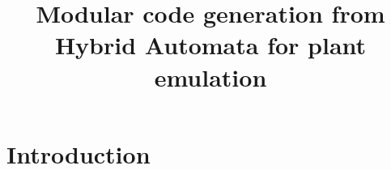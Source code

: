 \documentclass[conference]{IEEEtran}
\begin{document}
\title{Modular code generation from Hybrid Automata for plant emulation }

\author{}




\maketitle


\begin{abstract}

\end{abstract}


\section{Introduction}




 
\end{document}
